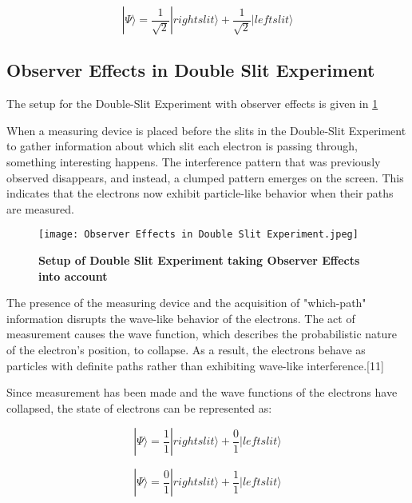 \documentclass{article}
\begin{document}
\begin{equation}
    |\Psi\rangle=\frac{1}{\sqrt{2}}|right slit\rangle+ \frac{1}{\sqrt{2}}|left slit\rangle
\end{equation}



\subsection{\Large \textbf{Observer Effects in Double Slit Experiment}}

The setup for the Double-Slit Experiment with observer effects is given in \ref{Setup for Observer Effects }

When a measuring device is placed before the slits in the Double-Slit Experiment to gather information about which slit each electron is passing through, something interesting happens. The interference pattern that was previously observed disappears, and instead, a clumped pattern emerges on the screen. This indicates that the electrons now exhibit particle-like behavior when their paths are measured.


\begin{figure}[h]
    \centering
    \texttt{[image: Observer Effects in Double Slit Experiment.jpeg]}
    \caption{\textbf{Setup of Double Slit Experiment taking Observer Effects into account}}
    \label{Setup for Observer Effects }
\end{figure}

The presence of the measuring device and the acquisition of "which-path" information disrupts the wave-like behavior of the electrons. The act of measurement causes the wave function, which describes the probabilistic nature of the electron's position, to collapse. As a result, the electrons behave as particles with definite paths rather than exhibiting wave-like interference.[11]


Since measurement has been made and the wave functions
of the electrons have collapsed, the state of electrons can be
represented as:

\begin{equation}
    |\Psi\rangle=\frac{1}{1}|right slit\rangle+ \frac{0}{1}|left slit\rangle
\end{equation}

\begin{equation}
    |\Psi\rangle=\frac{0}{1}|right slit\rangle+ \frac{1}{1}|left slit\rangle
\end{equation}
\end{document}
